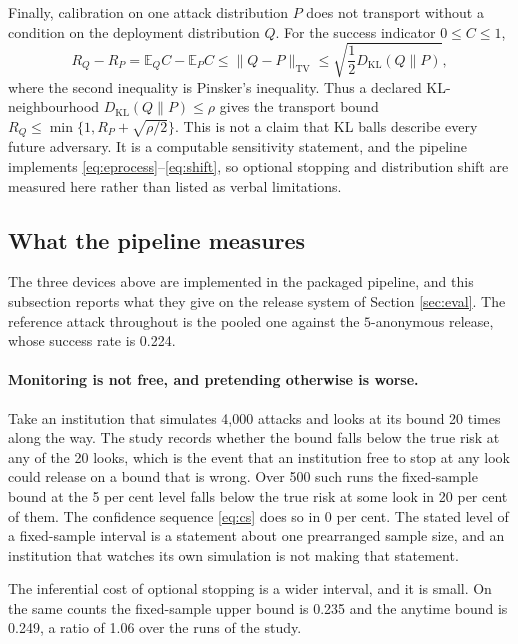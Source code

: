 \documentclass[11pt,a4paper]{article}
\theoremstyle{plain}
\theoremstyle{definition}
\newcommand{\E}{\mathbb{E}}
\begin{document}
Finally, calibration on one attack distribution $P$ does not transport without
a condition on the deployment distribution $Q$. For the success indicator
$0\le C\le1$,
\begin{equation}
R_Q-R_P=\E_Q C-\E_P C\le \|Q-P\|_{\mathrm{TV}}
\le\sqrt{\frac12D_{\mathrm{KL}}(Q\|P)},
\label{eq:shift}
\end{equation}
where the second inequality is Pinsker's inequality. Thus a declared
KL-neighbourhood $D_{\mathrm{KL}}(Q\|P)\le\rho$ gives the transport bound
$R_Q\le\min\{1,R_P+\sqrt{\rho/2}\}$. This is not a claim that KL balls describe
every future adversary. It is a computable sensitivity statement, and the pipeline
implements \eqref{eq:eprocess}--\eqref{eq:shift}, so optional stopping and
distribution shift are measured here rather than listed as verbal limitations.

\subsection{What the pipeline measures}\label{sec:sequential-evidence}

The three devices above are implemented in the packaged pipeline, and this
subsection reports what they give on the release system of Section
\ref{sec:eval}. The reference attack throughout is the pooled one against the
$5$-anonymous release, whose success rate is 0.224.

\paragraph{Monitoring is not free, and pretending otherwise is worse.}
Take an institution that simulates 4{,}000 attacks and looks at its
bound 20 times along the way. The study records whether the bound falls below
the true risk at any of the 20 looks, which is the event that an institution
free to stop at any look could release on a bound that is wrong. Over 500 such
runs the fixed-sample bound at the 5 per cent level falls below the true risk at
some look in 20 per cent of them. The confidence sequence
\eqref{eq:cs} does so in 0 per cent. The stated level of a
fixed-sample interval is a statement about one prearranged sample size, and an
institution that watches its own simulation is not making that statement.

The inferential cost of optional stopping is a wider interval, and it is small. On the same
counts the fixed-sample upper bound is 0.235 and the anytime bound is
0.249, a ratio of 1.06 over the runs of the study.
\end{document}
